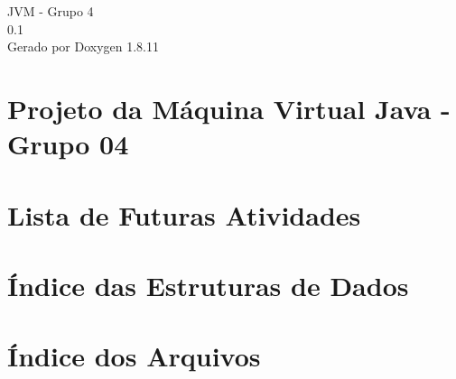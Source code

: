 \documentclass[twoside]{book}
\newcommand{\+}{\discretionary{\mbox{\scriptsize$\hookleftarrow$}}{}{}}
\newcommand{\clearemptydoublepage}{%
  \newpage{\pagestyle{empty}\cleardoublepage}%
}
\begin{document}
\hypersetup{pageanchor=false,
             bookmarksnumbered=true,
             pdfencoding=unicode
            }
\begin{titlepage}
\vspace*{7cm}
\begin{center}%
{\Large J\+VM -\/ Grupo 4 \\[1ex]\large 0.\+1 }\\
\vspace*{1cm}
{\large Gerado por Doxygen 1.8.11}\\
\end{center}
\end{titlepage}
\clearemptydoublepage
\tableofcontents
\clearemptydoublepage
{}
\hypersetup{pageanchor=true}

\chapter{Projeto da Máquina Virtual Java -\/ Grupo 04}
\label{index}\hypertarget{index}{}
\chapter{Lista de Futuras Atividades}
\label{todo}
\hypertarget{todo}{}

\chapter{Índice das Estruturas de Dados}

\chapter{Índice dos Arquivos}

\end{document}
